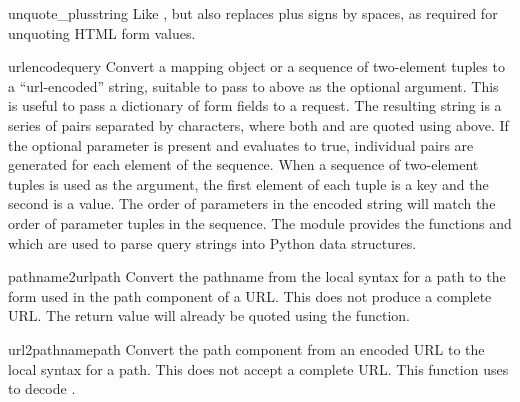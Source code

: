 \begin{funcdesc}{unquote_plus}{string}
Like , but also replaces plus signs by spaces, as
required for unquoting HTML form values.
\end{funcdesc}

\begin{funcdesc}{urlencode}{query}
Convert a mapping object or a sequence of two-element tuples  to a
``url-encoded'' string, suitable to pass to
 above as the optional  argument.  This
is useful to pass a dictionary of form fields to a 
request.  The resulting string is a series of
 pairs separated by \character{\&}
characters, where both  and  are quoted using
 above.  If the optional parameter  is
present and evaluates to true, individual  pairs
are generated for each element of the sequence.
When a sequence of two-element tuples is used as the  argument,
the first element of each tuple is a key and the second is a value.  The
order of parameters in the encoded string will match the order of parameter
tuples in the sequence.
The  module provides the functions
 and  which are used to
parse query strings into Python data structures.
\end{funcdesc}

\begin{funcdesc}{pathname2url}{path}
Convert the pathname  from the local syntax for a path to
the form used in the path component of a URL.  This does not produce a
complete URL.  The return value will already be quoted using the
 function.
\end{funcdesc}

\begin{funcdesc}{url2pathname}{path}
Convert the path component  from an encoded URL to the local
syntax for a path.  This does not accept a complete URL.  This
function uses  to decode .
\end{funcdesc}

